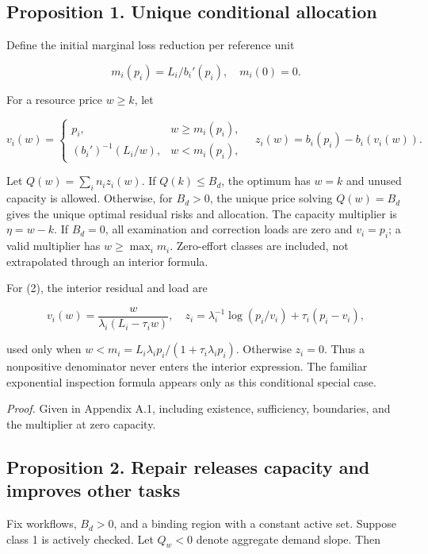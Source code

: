 \documentclass[
  11pt,
  a4paper,
]{article}
\begin{document}
\hypertarget{proposition-1.-unique-conditional-allocation}{%
\subsection{Proposition 1. Unique conditional
allocation}\label{proposition-1.-unique-conditional-allocation}}

Define the initial marginal loss reduction per reference unit

\[m_i(p_i)=L_i/b_i'(p_i),\quad m_i(0)=0.\]

For a resource price \(w\geq k\), let

\[v_i(w)=\begin{cases}
p_i,& w\geq m_i(p_i),\\
(b_i')^{-1}(L_i/w),& w<m_i(p_i),
\end{cases}
\quad z_i(w)=b_i(p_i)-b_i(v_i(w)). \tag{5}\]

Let \(Q(w)=\sum_i n_i z_i(w)\). If \(Q(k)\leq B_d\), the optimum has
\(w=k\) and unused capacity is allowed. Otherwise, for \(B_d>0\), the
unique price solving \(Q(w)=B_d\) gives the unique optimal residual
risks and allocation. The capacity multiplier is \(\eta=w-k\). If
\(B_d=0\), all examination and correction loads are zero and
\(v_i=p_i\); a valid multiplier has \(w\geq\max_i m_i\). Zero-effort
classes are included, not extrapolated through an interior formula.

For (2), the interior residual and load are

\[v_i(w)=\frac{w}{\lambda_i(L_i-\tau_i w)},\quad
z_i=\lambda_i^{-1}\log(p_i/v_i)+\tau_i(p_i-v_i), \tag{6}\]

used only when \(w<m_i=L_i\lambda_i p_i/(1+\tau_i\lambda_i p_i)\).
Otherwise \(z_i=0\). Thus a nonpositive denominator never enters the
interior expression. The familiar exponential inspection formula appears
only as this conditional special case.

\emph{Proof.} Given in Appendix A.1, including existence, sufficiency,
boundaries, and the multiplier at zero capacity.

\hypertarget{proposition-2.-repair-releases-capacity-and-improves-other-tasks}{%
\subsection{Proposition 2. Repair releases capacity and improves other
tasks}\label{proposition-2.-repair-releases-capacity-and-improves-other-tasks}}

Fix workflows, \(B_d>0\), and a binding region with a constant active
set. Suppose class 1 is actively checked. Let \(Q_w<0\) denote aggregate
demand slope. Then
\end{document}
